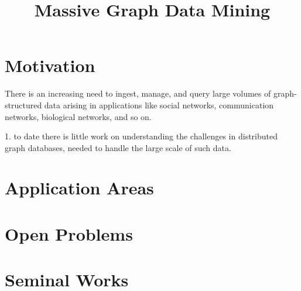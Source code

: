 \documentclass{scrartcl}
\begin{document}
  
  \title{Massive Graph Data Mining}
  \maketitle
    
\section{Motivation}
There is an increasing need to ingest, manage, and query large volumes
of graph-structured data arising in applications like social
networks, communication networks, biological networks, and so
on.

1. to date there is little work on understanding
the challenges in distributed graph databases, needed to handle
the large scale of such data.


\section{Application Areas}



\section{Open Problems}


\section{Seminal Works}
\end{document}
